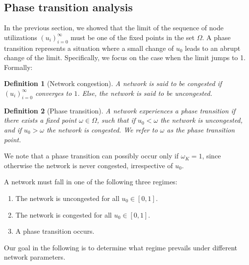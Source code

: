 \documentclass{IEEEtran}
\newtheorem{definition}{Definition}
\begin{document}
\subsection{Phase transition analysis}
\label{The phase transition phenomenon}
In the previous section, we showed that the limit of the sequence of node utilizations $(u_i)_{i=0}^{\infty}$ must be one of the fixed points in the
set $\Omega$.  A phase transition represents a situation where a small change of $u_0$ leads to an abrupt  change of the limit. Specifically, we
focus on the case when the limit jumps to 1. Formally:
\begin{definition}[Network congestion] A network is said to be \textit{congested} if $(u_i)_{i=0}^{\infty}$ converges to $1$. Else, the network is
said to be \textit{uncongested}.
\end{definition}
\begin{definition}
[Phase transition] A network experiences a phase transition if there exists a fixed point $\omega \in \Omega$, such that if
$u_0 < \omega$ the network is uncongested, and if $u_0 > \omega$ the network is congested. We refer to $\omega$ as the phase transition point.
\end{definition}
We note that a phase transition can possibly occur only if $\omega_K=1$, since otherwise the network is never  congested, irrespective of $u_0$.




A network must fall in one of the following  three regimes:
\begin{enumerate}
\item The network is uncongested for all $u_0 \in [0,1]$.
\item The network is congested for all $u_0 \in [0,1]$.
\item A phase transition occurs.
\end{enumerate}
Our goal in the following is to determine what regime prevails under different network parameters.
\end{document}

